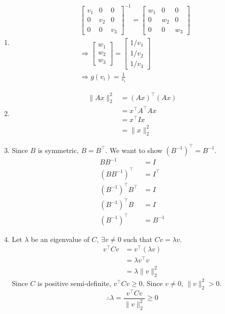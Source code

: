 \documentclass[fleqn]{article}
\begin{document}
\begin{enumerate}[label=(\alph*)]
\item
\begin{align*}
& \begin{bmatrix} v_1 & 0 & 0 \\ 0 & v_2 & 0 \\ 0 & 0 & v_3 \end{bmatrix}^{-1} = \begin{bmatrix} w_1 & 0 & 0 \\ 0 & w_2 & 0 \\ 0 & 0 & w_3 \end{bmatrix} \\
& \Rightarrow \begin{bmatrix} w_1 \\ w_2 \\ w_3 \end{bmatrix} = \begin{bmatrix} 1/v_1 \\ 1/v_2 \\ 1/v_3 \end{bmatrix} \\
& \Rightarrow g(v_i) = \frac{1}{v_i}
\end{align*}

\item
\begin{align*}
\|Ax\|_2^2 &= (Ax)^\top (Ax) \\
           &= x^\top A^\top A x \\
           &= x^\top I x \\
           &= \|x\|_2^2
\end{align*}

\item
Since $B$ is symmetric, $B = B^\top$. We want to show $(B^{-1})^\top = B^{-1}$.
\begin{align*}
BB^{-1} &= I \\
(BB^{-1})^\top &= I^\top \\
(B^{-1})^\top B^\top &= I \\
(B^{-1})^\top B &= I \\
(B^{-1})^\top &= B^{-1}
\end{align*}

\item
Let $\lambda$ be an eigenvalue of $C$, $\exists v \neq 0$ such that $Cv = \lambda v$.
\begin{align*}
v^\top Cv &= v^\top (\lambda v) \\
          &= \lambda v^\top v \\
          &= \lambda \|v\|_2^2
\end{align*}
Since $C$ is positive semi-definite, $v^\top Cv \geq 0$. Since $v \neq 0$, $\|v\|_2^2 > 0$.
\[
\therefore \lambda = \frac{v^\top Cv}{\|v\|_2^2} \geq 0
\]

\end{enumerate}
\end{document}
